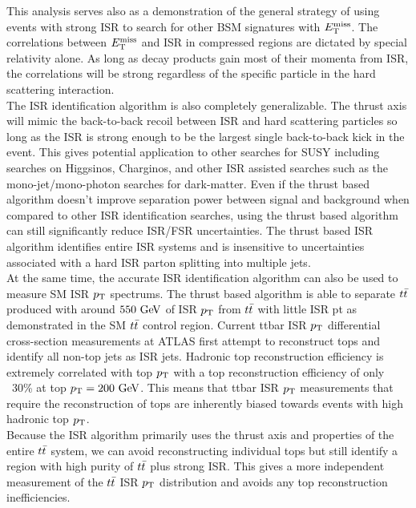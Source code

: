 \indent This analysis serves also as a demonstration of the general strategy of using events with strong ISR to search for other BSM signatures with $E_{\mathrm{T}}^{\mathrm{miss}}$.  The correlations between $E_{\mathrm{T}}^{\mathrm{miss}}$ and ISR in compressed regions are dictated by special relativity alone.  As long as decay products gain most of their momenta from ISR, the correlations will be strong regardless of the specific particle in the hard scattering interaction. \\

\indent The ISR identification algorithm is also completely generalizable.  The thrust axis will mimic the back-to-back recoil between ISR and hard scattering particles so long as the ISR is strong enough to be the largest single back-to-back kick in the event.  This gives potential application to other searches for SUSY including searches on Higgsinos, Charginos, and other ISR assisted searches such as the mono-jet/mono-photon searches for dark-matter.  Even if the thrust based algorithm doesn't improve separation power between signal and background when compared to other ISR identification searches, using the thrust based algorithm can still significantly reduce ISR/FSR uncertainties.  The thrust based ISR algorithm identifies entire ISR systems and is insensitive to uncertainties associated with a hard ISR parton splitting into multiple jets. \\

\indent At the same time, the accurate ISR identification algorithm can also be used to measure SM ISR $p_{\mathrm{T}}$ spectrums.  The thrust based algorithm is able to separate $t\bar{t}$ produced with around $550 \gev$ of ISR $p_{\mathrm{T}}$ from $t\bar{t}$ with little ISR pt as demonstrated in the SM $t\bar{t}$ control region.  Current ttbar ISR $p_{\mathrm{T}}$ differential cross-section measurements at ATLAS first attempt to reconstruct tops and identify all non-top jets as ISR jets.  Hadronic top reconstruction efficiency is extremely correlated with top $p_{\mathrm{T}}$ with a top reconstruction efficiency of only ~30\% at top $\pt = 200 \gev$.  This means that ttbar ISR $p_{\mathrm{T}}$ measurements that require the reconstruction of tops are inherently biased towards events with high hadronic top $p_{\mathrm{T}}$. \\

\indent Because the ISR algorithm primarily uses the thrust axis and properties of the entire $t\bar{t}$ system, we can avoid reconstructing individual tops but still identify a region with high purity of $t\bar{t}$ plus strong ISR.  This gives a more independent measurement of the $t\bar{t}$ ISR $p_{\mathrm{T}}$ distribution and avoids any top reconstruction inefficiencies. \\
